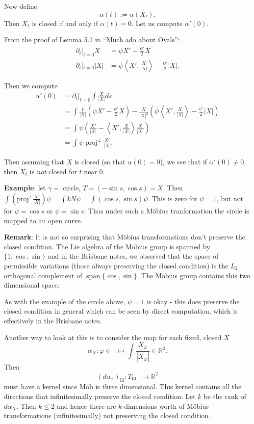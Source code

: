 \documentclass[12pt, a4paper]{amsart}
\theoremstyle{remark}
\DeclareMathOperator{\mob}{M\ddot{o}b}
\newcommand{\mobius}{M\"obius}
\DeclareMathOperator{\id}{Id}
\begin{document}
Now define
\[
\alpha(t) := \alpha(X_t).
\]
Then \(X_t\) is closed if and only if \(\alpha(t) = 0\). Let us compute \(\alpha'(0)\).

From the proof of Lemma 5.1 in ``Much ado about Ovals'':
\begin{align*}
\partial_t|_{t=0} X &= \psi X' - \frac{\psi'}{2} X \\
\partial_t|_{t=0} |X| &= \psi \left\langle X', \frac{X}{|X|} \right\rangle - \frac{\psi'}{2} |X|.
\end{align*}

Then we compute
\[
\begin{split}
\alpha'(0) &= \partial_t|_{t=0} \int \frac{X}{|X|} ds \\
&= \int \frac{1}{|X|} \left(\psi X' - \frac{\psi'}{2} X\right) - \frac{X}{|X|^2} \left(\psi \left\langle X', \frac{X}{|X|} \right\rangle - \frac{\psi'}{2} |X|\right) \\
&= \int \psi \left(\frac{X'}{|X|} -  \left\langle X', \frac{X}{|X|} \right\rangle\frac{X}{|X|}\right) \\
&= \int \psi \operatorname{proj}^{\perp} \frac{X'}{|X|}.
\end{split}
\]

Then assuming that \(X\) is closed (so that \(\alpha(0) = 0\)), we see that if \(\alpha'(0) \ne 0\), then \(X_t\) is \emph{not} closed for \(t\) near \(0\).

\textbf{Example}:  let $\gamma=$ circle, $T=(-\sin s, \cos s)=X$.   Then $\int\left( \text{proj}^\perp \frac{X'}{|X|} \right) \psi=\int kN\psi=\int (\cos s,\sin s)\psi$.   This is zero for $\psi=1$, but not for $\psi=\cos s$ or $\psi=\sin s$.   Thus under such a \mobius{} tranformation the circle is mapped to an open curve.

\textbf{Remark}: It is not so surprising that \mobius{} transformations don't preserve the closed condition. The Lie algebra of the \mobius{} group is spanned by \(\lbrace 1, \cos, \sin\rbrace\) and in the Brisbane notes, we observed that the space of permissible variations (those always preserving the closed condition) is the \(L_2\) orthogonal complement of \(\operatorname{span}\lbrace \cos, \sin \rbrace\). The \mobius{} group contains this two dimensional space.

As with the example of the circle above, \(\psi = 1\) is okay - this does preserve the closed condition in general which can be seen by direct computation, which is effectively in the Brisbane notes.

Another way to look at this is to consider the map for each fixed, closed \(X\)
\[
\alpha_X : \varphi \in \mob \mapsto \int \frac{X_{\varphi}}{|X_{\varphi}|} \in \mathbb{R}^2.
\]
Then
\[
(d\alpha_x)_{\id} : T_{\id} \mob \to \mathbb{R}^2
\]
must have a kernel since M\"ob is three dimensional. This kernel contains all the directions that infinitesimally preserve the closed condition. Let \(k\) be the rank of \(d\alpha_X\). Then \(k \leq 2\) and hence there are \(k\)-dimensions worth of \mobius{} transformations (infinitesimally) not preserving the closed condition.
\end{document}
